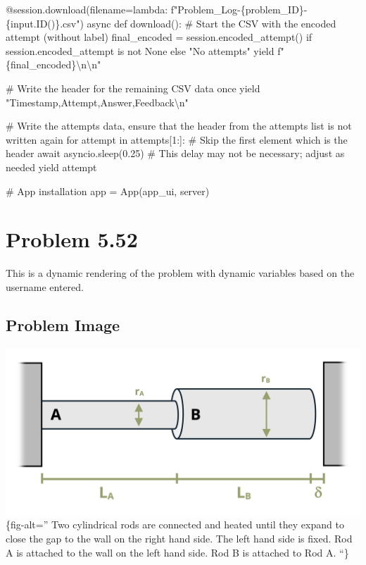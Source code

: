 \documentclass[
  letterpaper,
  DIV=11,
  numbers=noendperiod]{scrreprt}
\newenvironment{Shaded}{\begin{snugshade}}{\end{snugshade}}
\newcommand{\NormalTok}[1]{\textcolor[rgb]{0.00,0.23,0.31}{#1}}
\begin{document}
\begin{Shaded}
\begin{Highlighting}[]
\NormalTok{    @session.download(filename=lambda: f"Problem\_Log{-}\{problem\_ID\}{-}\{input.ID()\}.csv")}
\NormalTok{    async def download():}
\NormalTok{        \# Start the CSV with the encoded attempt (without label)}
\NormalTok{        final\_encoded = session.encoded\_attempt() if session.encoded\_attempt is not None else "No attempts"}
\NormalTok{        yield f"\{final\_encoded\}\textbackslash{}n\textbackslash{}n"}
        
\NormalTok{        \# Write the header for the remaining CSV data once}
\NormalTok{        yield "Timestamp,Attempt,Answer,Feedback\textbackslash{}n"}
        
\NormalTok{        \# Write the attempts data, ensure that the header from the attempts list is not written again}
\NormalTok{        for attempt in attempts[1:]:  \# Skip the first element which is the header}
\NormalTok{            await asyncio.sleep(0.25)  \# This delay may not be necessary; adjust as needed}
\NormalTok{            yield attempt}


\NormalTok{\# App installation}
\NormalTok{app = App(app\_ui, server)}
\end{Highlighting}
\end{Shaded}

\chapter*{Problem 5.52}\label{problem-5.52}


This is a dynamic rendering of the problem with dynamic variables based
on the username entered.

\section*{Problem Image}\label{problem-image-55}


\includegraphics{images/224.png}\{fig-alt='' Two cylindrical rods are
connected and heated until they expand to close the gap to the wall on
the right hand side. The left hand side is fixed. Rod A is attached to
the wall on the left hand side. Rod B is attached to Rod A. ``\}
\end{document}
